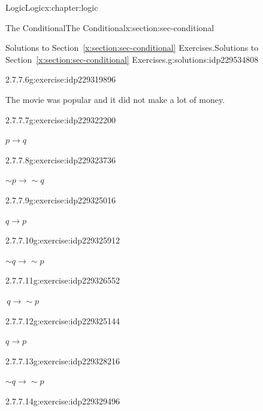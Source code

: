\documentclass[twoside,10pt,]{book}
\newcommand{\xreffont}{\relax}
\numberwithin{equation}{section}
\newcommand{\conditional}{{p {\rightarrow} q}}
\newcommand{\inverse}{{\sim\!{p}{} {\rightarrow} \sim\!{q}{}}}
\newcommand{\converse}{{q {\rightarrow} p}}
\newcommand{\contrapositive}{{\sim\!{q}{} {\rightarrow} \sim\!{p}{}}}
\begin{document}
\begin{chapterptx}{Logic}{}{Logic}{}{}{x:chapter:logic}
\begin{sectionptx}{The Conditional}{}{The Conditional}{}{}{x:section:sec-conditional}
\begin{solutions-subsection}{Solutions to Section~{\xreffont\ref*{x:section:sec-conditional}} Exercises.}{}{Solutions to Section~{\xreffont\ref*{x:section:sec-conditional}} Exercises.}{}{}{g:solutions:idp229534808}
\begin{exercisegroup}
\begin{divisionsolutioneg}{2.7.7.6}{}{g:exercise:idp229319896}
\par\smallskip%
\noindent\hypertarget{g:solution:idp229317464-main}{}The movie was popular and it did not make a lot of money.\end{divisionsolutioneg}%
\end{exercisegroup}
\par\medskip\noindent
\begin{exercisegroup}
\begin{divisionsolutioneg}{2.7.7.7}{}{g:exercise:idp229322200}%
\par\smallskip%
\noindent\hypertarget{g:solution:idp229317976-main}{}\(\conditional\)\end{divisionsolutioneg}%
\begin{divisionsolutioneg}{2.7.7.8}{}{g:exercise:idp229323736}%
\par\smallskip%
\noindent\hypertarget{g:solution:idp229324632-main}{}\(\inverse\)\end{divisionsolutioneg}%
\begin{divisionsolutioneg}{2.7.7.9}{}{g:exercise:idp229325016}%
\par\smallskip%
\noindent\hypertarget{g:solution:idp229326040-main}{}\(\converse \)\end{divisionsolutioneg}%
\begin{divisionsolutioneg}{2.7.7.10}{}{g:exercise:idp229325912}%
\par\smallskip%
\noindent\hypertarget{g:solution:idp229325656-main}{}\(\contrapositive\)\end{divisionsolutioneg}%
\begin{divisionsolutioneg}{2.7.7.11}{}{g:exercise:idp229326552}%
\par\smallskip%
\noindent\hypertarget{g:solution:idp229329880-main}{}\(\, q {\rightarrow}{} \sim\!{p}{}\)\end{divisionsolutioneg}%
\begin{divisionsolutioneg}{2.7.7.12}{}{g:exercise:idp229325144}%
\par\smallskip%
\noindent\hypertarget{g:solution:idp229329240-main}{}\(\converse\)\end{divisionsolutioneg}%
\begin{divisionsolutioneg}{2.7.7.13}{}{g:exercise:idp229328216}%
\par\smallskip%
\noindent\hypertarget{g:solution:idp229328344-main}{}\(\contrapositive \)\end{divisionsolutioneg}%
\begin{divisionsolutioneg}{2.7.7.14}{}{g:exercise:idp229329496}%

\end{divisionsolutioneg}
\end{exercisegroup}
\end{solutions-subsection}
\end{sectionptx}
\end{chapterptx}
\end{document}
